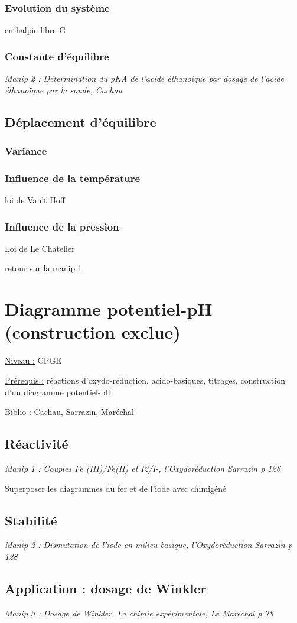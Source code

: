\documentclass{article}%
\begin{document}
\subsubsection{Evolution du système}
enthalpie libre G
\subsubsection{Constante d’équilibre}
\textit{Manip 2 : Détermination du pKA de l’acide éthanoique par dosage de l’acide éthanoïque par la soude, Cachau}
\subsection{Déplacement d’équilibre}
\subsubsection{Variance}
\subsubsection{Influence de la température}
loi de Van’t Hoff
\subsubsection{Influence de la pression}
Loi de Le Chatelier

retour sur la manip 1
\section{Diagramme potentiel-pH (construction exclue)}
\underline{Niveau :} CPGE 

\underline{Prérequis :} réactions d'oxydo-réduction, acido-basiques, titrages, construction d'un diagramme potentiel-pH

\underline{Biblio :} Cachau, Sarrazin, Maréchal

\subsection{Réactivité}
\textit{Manip 1 : Couples Fe (III)/Fe(II) et I2/I-, l'Oxydoréduction Sarrazin p 126}

Superposer les diagrammes du fer et de l'iode avec chimigéné
\subsection{Stabilité}
\textit{Manip 2 : Dismutation de l'iode en milieu basique, l'Oxydoréduction Sarrazin p 128}
\subsection{Application : dosage de Winkler}
\textit{Manip 3 : Dosage de Winkler, La chimie expérimentale, Le Maréchal p 78}
\end{document}
